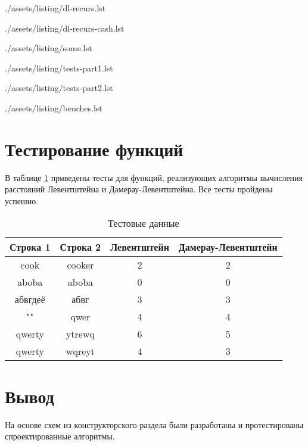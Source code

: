 \clearpage
\begin{lstinputlisting}[
	caption={Рекурсивный алгоритм Дамерау-Левентштейна},
	label={lst:dl-recurs},
	style={golang}
]{./assets/listing/dl-recurs.lst}
\end{lstinputlisting}

\clearpage
\begin{lstinputlisting}[
	caption={Рекурсивный алгоритм с кэшем Дамерау-Левентштейна},
	label={lst:dl-recurs-cash},
	style={golang}
]{./assets/listing/dl-recurs-cash.lst}
\end{lstinputlisting}

\clearpage
\begin{lstinputlisting}[
	caption={Вспомогательные функции для расчёта расстояний},
	label={lst:some},
	style={golang}
]{./assets/listing/some.lst}
\end{lstinputlisting}

\clearpage
\begin{lstinputlisting}[
	caption={Пример реализации тестов},
	label={lst:tests},
	style={golang}
]{./assets/listing/tests-part1.lst}
\end{lstinputlisting}

\clearpage
% 
% 
% 
% 
\begin{lstinputlisting}[
	caption={Листинг \ref{lst:tests}: Пример реализации тестов},
	style={golang}
]{./assets/listing/tests-part2.lst}
\end{lstinputlisting}

\clearpage
\begin{lstinputlisting}[
	caption={Пример реализации бенчмарка},
	label={lst:benches},
	style={golang}
]{./assets/listing/benches.lst}
\end{lstinputlisting}

\clearpage
\section{Тестирование функций}

В таблице \ref{tbl:test} приведены тесты для функций, реализующих алгоритмы вычисления расстояний Левентштейна и Дамерау-Левентштейна.
Все тесты пройдены успешно.

\begin{table}[h!]
	\begin{center}
		\caption{\label{tbl:test}Тестовые данные}
		\begin{tabular}{|c|c|c|c|}
			\hline
			\bfseries Строка 1 & \bfseries Строка 2 & \bfseries Левентштейн & \bfseries Дамерау-Левентштейн \\ 
			\hline
			cook & cooker & 2 & 2 \\ \hline
			aboba & aboba & 0 & 0 \\ \hline
			абвгдеё & абвг & 3 & 3 \\ \hline
			"" & qwer & 4 & 4 \\ \hline %
			qwerty & ytrewq & 6 & 5 \\ \hline
			qwerty & wqreyt & 4 & 3 \\ \hline
		\end{tabular}
	\end{center}
\end{table}

\section*{Вывод}

На основе схем из конструкторского раздела были разработаны и протестированы спроектированные алгоритмы.

